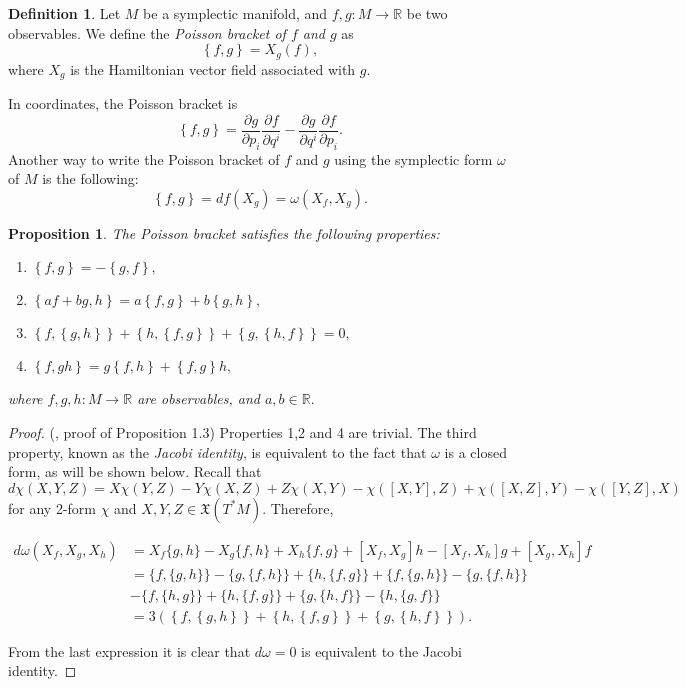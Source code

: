 \documentclass[12pt, letterpaper, reqno]{amsart}
\theoremstyle{definition}
\newtheorem{df}{Definition}
\theoremstyle{plain}
\newtheorem{prop}{Proposition}
\theoremstyle{remark}
\begin{document}
\begin{df}
	Let $ M $ be a symplectic manifold, and $ f,g: M \rightarrow \mathbb{R} $ be two observables. We define the \textit{Poisson bracket of $ f $ and $ g $ } as 
	$$ \left\{ f,g \right\}= X_g(f),$$ 
	where $ X_g  $ is the Hamiltonian vector field associated with $ g. $ 
\end{df}
In coordinates, the Poisson bracket is 
$$ \left\{ f,g \right\} = \frac{\partial g}{\partial p_i}\frac{\partial f}{\partial q^i} - \frac{\partial g}{\partial q^i} \frac{\partial f}{\partial p_i}.   $$ 
Another way to write the Poisson bracket of $ f $ and $ g $ using the symplectic form $ \omega $ of $M$ is the following:
$$ \left\{ f,g \right\} = df(X_g)=\omega (X_f,X_g). $$ 
\begin{prop}\label{prop:Poisson_bracket_properties}
	The Poisson bracket satisfies the following properties:
	\begin{enumerate}
		\item $ \left\{ f,g \right\} = -\left\{ g,f \right\},$ 
		\item $ \left\{ af+bg,h \right\} = a\left\{ f,g \right\}+ b \left\{ g,h \right\} ,   $ 
		\item $ \left\{ f, \left\{ g,h \right\}  \right\} +\left\{ h, \left\{ f,g \right\}  \right\} + \left\{ g, \left\{ h,f \right\}  \right\} =0, $  
		\item $ \left\{ f,gh \right\} =g \left\{ f,h \right\} + \left\{ f,g \right\} h,$ 
	\end{enumerate}
	where $ f,g,h: M \rightarrow \mathbb{R} $ are observables, and $ a,b\in \mathbb{R}. $ 
\end{prop}
\begin{proof}
	(\cite{poisson}, proof of Proposition 1.3) Properties 1,2 and 4 are trivial. The third property, known as the \textit{Jacobi identity},  is equivalent to the fact that $ \omega $ is a closed form, as will be shown below. Recall that $$ d\chi(X,Y,Z)=X\chi(Y,Z)-Y\chi(X,Z)+Z\chi(X,Y)-\chi([X,Y],Z)+\chi([X,Z],Y)-\chi([Y,Z],X) $$ 
	for any 2-form $ \chi $ and $ X,Y,Z\in \mathfrak{X}(T^*M). $ Therefore, 
	

$\begin{aligned}
	d \omega\left(X_{f}, X_{g}, X_{h}\right) &=X_{f}\{g, h\}-X_{g}\{f, h\}+X_{h}\{f, g\}+\left[X_{f}, X_{g}\right] h-\left[X_{f}, X_{h}\right] g+\left[X_{g}, X_{h}\right] f \\
&=\{f,\{g, h\}\}-\{g,\{f, h\}\}+\{h,\{f, g\}\}+\{f,\{g, h\}\}-\{g,\{f, h\}\} \\
&-\{f,\{h, g\}\}+\{h,\{f, g\}\}+\{g,\{h, f\}\}-\{h,\{g, f\}\} \\
&=3 \left( \left\{ f, \left\{ g,h \right\}  \right\} +\left\{ h, \left\{ f,g \right\}  \right\} + \left\{ g, \left\{ h,f \right\}  \right\}\right).  
\end{aligned}$

From the last expression it is clear that $ d\omega=0 $ is equivalent to the Jacobi identity.
\end{proof}
\end{document}
